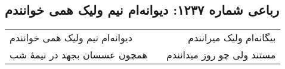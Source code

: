 \begin{center}
\section*{رباعی شماره ۱۲۳۷: دیوانه‌ام نیم ولیک همی خوانندم}
\label{sec:1237}
\begin{longtable}{l p{0.5cm} r}
دیوانه‌ام نیم ولیک همی خوانندم
&&
بیگانه‌ام ولیک میرانندم
\\
همچون عسسان بجهد در نیمهٔ شب
&&
مستند ولی چو روز میدانندم
\\
\end{longtable}
\end{center}
